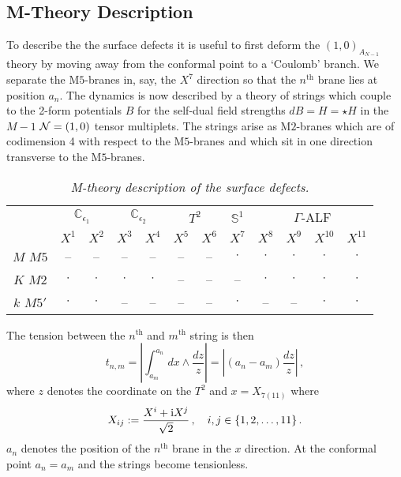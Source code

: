 \documentclass[main.tex]{subfiles}
\begin{document}
\subsection{M-Theory Description}
To describe the the surface defects it is useful to first deform the $(1,0)_{A_{N-1}}$ theory by moving away from the conformal point to a `Coulomb' branch. We separate the M$5$-branes in, say, the $X^7$ direction so that the $n^{\text{th}}$ brane lies at position $a_{n}$. The dynamics is now described by a theory of strings which couple to the 2-form potentials $B$ for the self-dual field strengths $dB=H=\star H$ in the $M-1$ $\mathcal{N}=(1,0)$ tensor multiplets. The strings arise as M$2$-branes which are of codimension 4 with respect to the M$5$-branes and which sit in one direction transverse to the M$5$-branes. 
\begin{table}[ht!]
\centering
\begin{tabular}{ c |c| c| c| c| c| c| c| c| c| c| c|}
&\multicolumn{2}{c|}{$\mathbb{C}_{\epsilon_1}$}&\multicolumn{2}{c|}{$\mathbb{C}_{\epsilon_2}$}&\multicolumn{2}{c|}{$T^2$}&\multicolumn{1}{c|}{$\mathbb{S}^1$}&\multicolumn{4}{c|}{$\Gamma$-ALF}\\
   & $X^1$ & $X^2$ & $X^3$ & $X^4$ & $X^5$ & $X^6$ & $X^7$ & $X^8$ & $X^9$& $X^{10}$&$X^{11}$\\\hline 
 $M$ $M5$ & -- & -- & -- & -- & -- & -- & $\cdot$ & $\cdot$ & $\cdot$ & $\cdot$&$\cdot$\\ \hline
  $K$ $M2$ & $\cdot$ & $\cdot$ & $\cdot$ & $\cdot$ & -- & -- & --&$\cdot$ & $\cdot$ & $\cdot$ & $\cdot$ \\\hline
  $k$ $M5'$ & $\cdot$ & $\cdot$ & -- & -- & -- & -- & $\cdot$ & --& -- &$\cdot$ & $\cdot$ \\\hline
\end{tabular}
\caption{\it M-theory description of the surface defects.}
\label{table:Mtheory}
\end{table}
%
The tension between the $n^{\text{th}}$ and $m^{\text{th}}$ string is then \cite{Mikhailov:1997jv}
\begin{equation}\label{eqn:stringtension}
t_{n,m}=\left|\int^{a_{n}}_{a_{m}}dx\wedge \frac{dz}{z}\right|=\left|(a_{n}-a_{m})\frac{dz}{z}\right|\,,
\end{equation}
where $z$ denotes the coordinate on the $T^2$ and $x=X_{7(11)}$ where
\begin{equation}
X_{ij}:=\frac{X^i+\mathrm{i} X^j}{\sqrt{2}}\,,\quad i,j\in\{1,2,\dots,11\}\,.
\end{equation} 
$a_n$ denotes the position of the $n^{\text{th}}$ brane in the $x$ direction. At the conformal point $a_{n}=a_{m}$ and the strings become tensionless.
\end{document}
